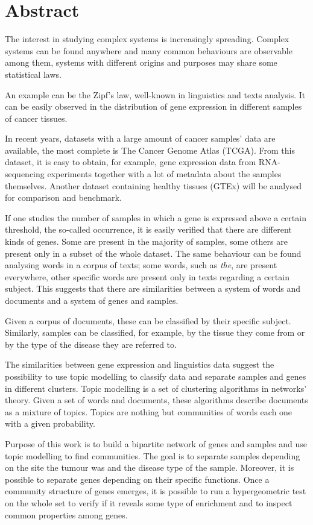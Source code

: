 \chapter*{Abstract}
The interest in studying complex systems is increasingly spreading.
Complex systems can be found anywhere and many common behaviours are observable among them, systems with different origins and purposes may share  some statistical laws.

An example can be the Zipf's law, well-known in linguistics and texts analysis. It can be easily observed in the distribution of gene expression in different samples of cancer tissues.

In recent years, datasets with a large amount of cancer samples' data are available, the most complete is The Cancer Genome Atlas (TCGA). From this dataset, it is easy to obtain, for example, gene expression data from RNA-sequencing experiments together with a lot of metadata about the samples themselves. Another dataset containing healthy tissues (GTEx) will be analysed for comparison and benchmark.

If one studies the number of samples in which a gene is expressed above a certain threshold, the so-called occurrence, it is easily verified that there are different kinds of genes. Some are present in the majority of samples, some others are present only in a subset of the whole dataset. The same behaviour can be found analysing words in a corpus of texts; some words, such as \emph{the}, are present everywhere, other specific words are present only in texts regarding a certain
subject. This suggests that there are similarities between a system of words and documents and a system of genes and samples.

Given a corpus of documents, these can be classified by their specific subject. Similarly, samples can be classified, for example, by the tissue they come from or by the type of the disease they are referred to.

The similarities between gene expression and linguistics data suggest the possibility to use topic modelling to classify data and separate samples and genes in different clusters. Topic modelling is a set of clustering algorithms in networks' theory. Given a set of words and documents, these algorithms describe documents as a mixture of topics. Topics are nothing but communities of words each one with a given probability.

Purpose of this work is to build a bipartite network of genes and samples and use topic modelling to find communities. The goal is to separate samples depending on the site the tumour was and the disease type of the sample. Moreover, it is possible to separate genes depending on their specific functions. Once a community structure of genes emerges, it is possible to run a hypergeometric test on the whole set to verify if it reveals some type of enrichment and to inspect common properties among genes.

